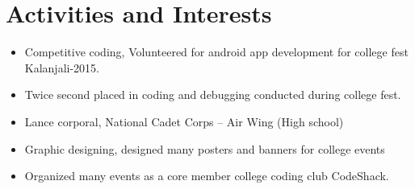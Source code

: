 \documentclass[10pt]{article}
\begin{document}
\section{Activities and Interests}
\begin{itemize}
        \itemsep0em
    \item
        Competitive coding, Volunteered for android app development for college fest Kalanjali-2015.
    \item
        Twice second placed in coding and debugging conducted during college fest.
    \item
        Lance corporal, National Cadet Corps – Air Wing (High school)
    \item
        Graphic designing, designed many posters and banners for college events
    \item
         Organized many events as a core member college coding club CodeShack.
\end{itemize}
\end{document}
